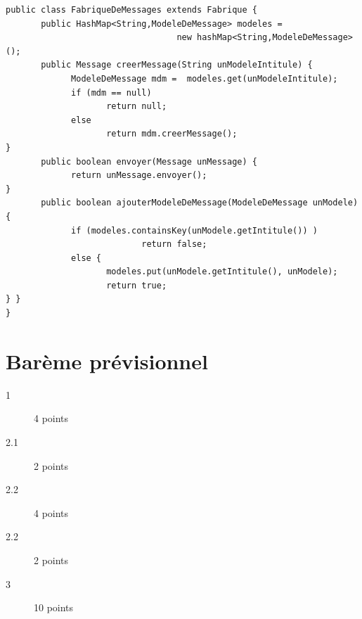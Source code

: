 \documentclass[12pt]{article}
\begin{document}
\begin{lstlisting}
public class FabriqueDeMessages extends Fabrique {
       public HashMap<String,ModeleDeMessage> modeles =
                                  new hashMap<String,ModeleDeMessage>();
       public Message creerMessage(String unModeleIntitule) {
             ModeleDeMessage mdm =  modeles.get(unModeleIntitule);
             if (mdm == null)
                    return null;
             else
                    return mdm.creerMessage();
}
       public boolean envoyer(Message unMessage) {
             return unMessage.envoyer();
}
       public boolean ajouterModeleDeMessage(ModeleDeMessage unModele){
             if (modeles.containsKey(unModele.getIntitule()) )
                           return false;
             else {
                    modeles.put(unModele.getIntitule(), unModele);
                    return true;
} }
}
\end{lstlisting}

\section*{Bar\`eme prévisionnel}

\begin{description}
\item[1] 4 points 
\item[2.1] 2 points 
\item[2.2] 4 points 
\item[2.2] 2 points 
\item[3] 10 points 
\end{description}
\end{document}
